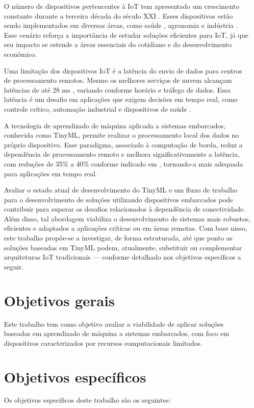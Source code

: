 \documentclass[repeatfields,xlists,xpacks,oneside]{ufrgscca}
\begin{document}
O número de dispositivos pertencentes à IoT tem apresentado um crescimento constante durante a terceira década do século XXI \cite{Sinha2024}. Esses dispositivos estão sendo implementados em diversas áreas, como saúde \cite{iotSaude}, agronomia \cite{iotAgricultura} e indústria \cite{iotIndustria}. Esse cenário reforça a importância de estudar soluções eficientes para IoT, já que seu impacto se estende a áreas essenciais do cotidiano e do desenvolvimento econômico.

Uma limitação dos dispositivos IoT é a latência do envio de dados para centros de processamento remotos. Mesmo os melhores serviços de nuvem alcançam latências de até 28 ms \cite{latencia}, variando conforme horário e tráfego de dados. Essa latência é um desafio em aplicações que exigem decisões em tempo real, como controle crítico, automação industrial e dispositivos de saúde \cite{Oladokun2025}.

A tecnologia de aprendizado de máquina aplicada a sistemas embarcados, conhecida como TinyML, permite realizar o processamento local dos dados no próprio dispositivo. Esse paradigma, associado à computação de borda, reduz a dependência de processamento remoto e melhora significativamente a latência, com reduções de 35\% a 40\% conforme indicado em \cite{edge}, tornando-a mais adequada para aplicações em tempo real.

Avaliar o estado atual de desenvolvimento do TinyML e um fluxo de trabalho para o desenvolvimento de soluções utilizando dispositivos embarcados pode contribuir para superar os desafios relacionados à dependência de conectividade. Além disso, tal abordagem viabiliza o desenvolvimento de sistemas mais robustos, eficientes e adaptados a aplicações críticas ou em áreas remotas. Com base nisso, este trabalho propõe-se a investigar, de forma estruturada, até que ponto as soluções baseadas em TinyML podem, atualmente, substituir ou complementar arquiteturas IoT tradicionais — conforme detalhado nos objetivos específicos a seguir.

\section{Objetivos gerais}
Este trabalho tem como objetivo avaliar a viabilidade de aplicar soluções baseadas em aprendizado de máquina a sistemas embarcados, com foco em dispositivos caracterizados por recursos computacionais limitados.

\section{Objetivos específicos}
Os objetivos específicos deste trabalho são os seguintes:
\end{document}
